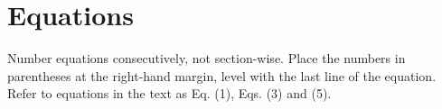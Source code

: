 \section{Equations}
Number equations consecutively, not section-wise. Place the numbers in parentheses at
the right-hand margin, level with the last line of the equation. Refer to equations in the
text as Eq. (1), Eqs. (3) and (5).
